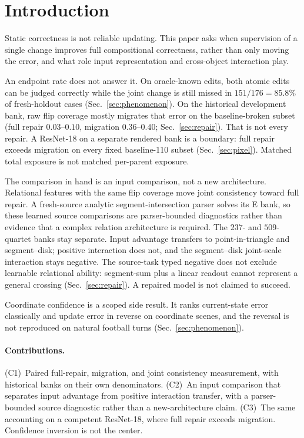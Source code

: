 \section{Introduction}
\label{sec:intro}

Static correctness is not reliable updating. This paper asks when
supervision of a single change improves full compositional correctness,
rather than only moving the error, and what role input representation and
cross-object interaction play.

An endpoint rate does not answer it. On oracle-known edits, both atomic
edits can be judged correctly while the joint change is still missed in
$151/176 = 85.8\%$ of fresh-holdout cases (Sec.~\ref{sec:phenomenon}).
On the historical development bank, raw flip coverage mostly migrates that
error on the baseline-broken subset (full repair $0.03$--$0.10$, migration
$0.36$--$0.40$; Sec.~\ref{sec:repair}). That is not every repair. A
ResNet-18 on a separate rendered bank is a boundary: full repair exceeds
migration on every fixed baseline-110 subset (Sec.~\ref{sec:pixel}).
Matched total exposure is not matched per-parent exposure.

The comparison in hand is an input comparison, not a new architecture.
Relational features with the same flip coverage move joint consistency
toward full repair. A fresh-source analytic segment-intersection parser
solves its E bank, so these learned source comparisons are parser-bounded
diagnostics rather than evidence that a complex relation architecture is
required. The $237$- and $509$-quartet banks stay separate. Input
advantage transfers to point-in-triangle and segment--disk; positive
interaction does not, and the segment--disk joint-scale interaction stays
negative. The source-task typed negative does not exclude learnable
relational ability: segment-sum plus a linear readout cannot represent a
general crossing (Sec.~\ref{sec:repair}). A repaired model is not claimed
to succeed.

Coordinate confidence is a scoped side result. It ranks current-state error
classically and update error in reverse on coordinate scenes, and the
reversal is not reproduced on natural football turns
(Sec.~\ref{sec:phenomenon}).

\paragraph{Contributions.} (C1)~Paired full-repair, migration, and joint
consistency measurement, with historical banks on their own denominators.
(C2)~An input comparison that separates input advantage from positive
interaction transfer, with a parser-bounded source diagnostic rather than a
new-architecture claim. (C3)~The same accounting on a competent ResNet-18,
where full repair exceeds migration. Confidence inversion is not the center.
